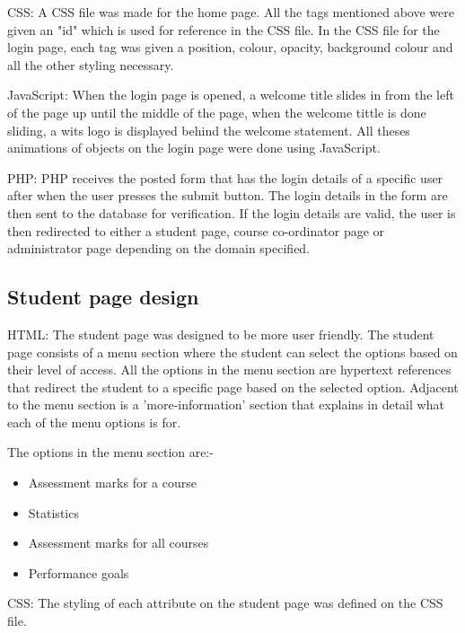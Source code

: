 CSS: A CSS file was made for the home page. All the tags mentioned above were given an "id" which is used for reference in the CSS file. In the CSS file for the login page, each tag was given a position, colour, opacity, background colour and all the other styling necessary. 

JavaScript: When the login page is opened, a welcome title slides in from the left of the page up until the middle of the page, when the welcome tittle is done sliding, a wits logo is displayed behind the welcome statement. All theses animations of objects on the login page were done using JavaScript.    

     
PHP: PHP receives the posted form that has the login details of a specific user after when the user presses the submit button. The login details in the form are then sent to the database for verification. If the login details are valid, the user is then redirected to either a student page, course co-ordinator page or administrator page depending on the domain specified.   

\subsection{Student page design}

HTML: The student page was designed to be more user friendly. The student page consists of a menu section where the student can select the options based on their level of access. All the options in the menu section are hypertext references that redirect the student to a specific page based on the selected option. Adjacent to the menu section is a 'more-information' section that explains in detail what each of the menu options is for.

The options in the menu section are:-

\begin{itemize}
\item Assessment marks for a course
\item Statistics
\item Assessment  marks for all courses
\item Performance goals
\end{itemize} 


CSS: The styling of each attribute on the student page was defined on the CSS file.

